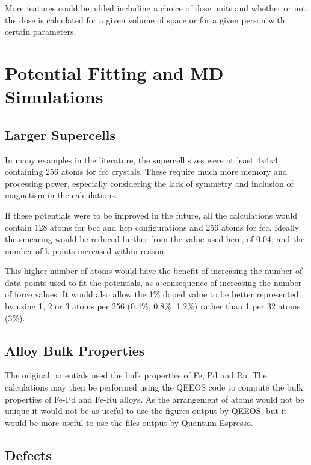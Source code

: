 More features could be added including a choice of dose units and whether or not the dose is calculated for a given volume of space or for a given person with certain parameters.



\section{Potential Fitting and MD Simulations}

\subsection{Larger Supercells}

In many examples in the literature, the supercell sizes were at least 4x4x4 containing 256 atoms for \acrshort{fcc} crystals.  These require much more memory and processing power, especially considering the lack of symmetry and inclusion of magnetism in the calculations.  

If these potentials were to be improved in the future, all the calculations would contain 128 atoms for \acrshort{bcc} and \acrshort{hcp} configurations and 256 atoms for \acrshort{fcc}.  Ideally the smearing would be reduced further from the value used here, of 0.04, and the number of k-points increased within reason.

This higher number of atoms would have the benefit of increasing the number of data points used to fit the potentials, as a consequence of increasing the number of force values.  It would also allow the 1\% doped value to be better represented by using 1, 2 or 3 atoms per 256 (0.4\%, 0.8\%, 1.2\%) rather than 1 per 32 atoms (3\%).

\subsection{Alloy Bulk Properties}

The original potentials used the bulk properties of Fe, Pd and Ru.  The calculations may then be performed using the QEEOS code to compute the bulk properties of Fe-Pd and Fe-Ru alloys.  As the arrangement of atoms would not be unique it would not be as useful to use the figures output by QEEOS, but it would be more useful to use the files output by Quantum Espresso.  

\subsection{Defects}

